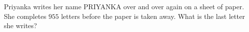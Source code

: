 Priyanka writes her name PRIYANKA over and over again on a sheet of paper. She completes $955$ letters before the paper is taken away. What is the last letter she writes?

